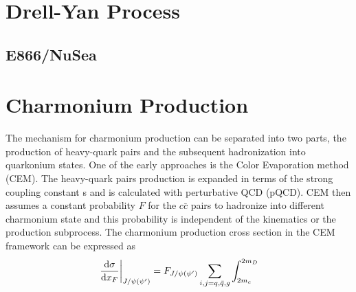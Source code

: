 \section{Drell-Yan Process}
\label{sec:DY}


\subsection{E866/NuSea}
\label{sec:E866}

\section{Charmonium Production}
\label{sec:jpsi}
The mechanism for charmonium production can be separated into two parts, the 
production of heavy-quark pairs and the subsequent hadronization into 
quarkonium states. One of the early approaches is the Color Evaporation method 
(CEM)\cite{einhorn1975,bodwin1995,bodwin1997}. The heavy-quark pairs production
is expanded in terms of the strong coupling constant s and is calculated with 
perturbative QCD (pQCD). CEM then assumes a constant probability $F$ for the 
$c\bar{c}$ pairs to hadronize into different charmonium state and this 
probability is independent of the kinematics or the production subprocess. The 
charmonium production cross section in the CEM framework can be expressed as
\begin{equation}
\eval{\dv{\sigma}{x_{F}}}_{J/\psi\left(\psi^\prime\right)} =
	F_{J/\psi\left(\psi^\prime\right)} \sum_{i,j=q,\bar{q},g} \int_{2m_c}^{2m_D}
\end{equation}




